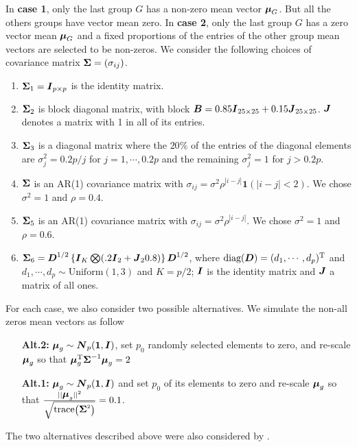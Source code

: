 \documentclass[12pt]{article}
\theoremstyle{plain}%
\theoremstyle{definition}
\def\diag{\hbox{diag}}
\def\diag{\hbox{diag}}
\def\trace{\hbox{trace}}
\def\diag{\hbox{diag}}
\def\diag{\hbox{diag}}
\def\trace{\hbox{trace}}
\def\trans{^{\rm T}}
\def\bone{{\mathbf 1}}
\newcommand{\uB}       {\mbox{\boldmath$B$}}
\newcommand{\uD}       {\mbox{\boldmath$D$}}
\newcommand{\uI}       {\mbox{\boldmath$I$}}
\newcommand{\uJ}       {\mbox{\boldmath$J$}}
\newcommand{\uN}       {\mbox{\boldmath$N$}}
\newcommand{\umu}               {\mbox{\boldmath$\mu$}}
\newcommand{\uSigma}            {\mbox{\boldmath$\Sigma$}}
\begin{document}
In \textbf{case 1}, only the last group $G$ has a non-zero mean vector $\umu_G$. But all the others groups have vector mean zero. In \textbf{case 2}, only the last group $G$ has a zero vector mean $\umu_{G}$ and a fixed proportions of the entries of the other group mean vectors are selected to be non-zeros.  
We consider the following choices of covariance matrix $\uSigma=(\sigma_{ij})$.
\begin{enumerate}
  \item $\uSigma_{1} = \uI_{p \times p} $ is the identity matrix.
  \item $\uSigma_{2} $ is block diagonal matrix, with block $\uB = 0.85\uI_{25 \times 25} + 0.15\uJ_{25 \times 25}$. $\uJ$ denotes a matrix with 1 in all of its entries.
  \item $\uSigma_{3}$ is a diagonal matrix where the $20\%$ of the entries of the diagonal elements are $\sigma^2_j = 0.2p/j$ for $j = 1, \cdots, 0.2p$ and the remaining $\sigma^2_j = 1$ for $j > 0.2p$.
  \item $\uSigma$ is an AR(1) covariance matrix with $\sigma_{ij}=\sigma^2\rho^{|i - j|}\bone(|i-j| < 2)$. We chose $\sigma^2 = 1$ and $\rho = 0.4$.
  \item $\uSigma_{5}$ is an AR(1) covariance matrix with $\sigma_{ij}=\sigma^2\rho^{|i - j|}$. We chose $\sigma^2 = 1$ and $\rho = 0.6$.
  \item $\uSigma_6 = \uD^{1/2}\left\{ \uI_K \bigotimes (.2\uI_2 + \uJ_{2}0.8) \right\}\uD^{1/2}$, where $\diag(\uD)=(d_{1}, \cdots, d_{p})\trans$ and $d_{1}, \cdots, d_{p} \sim \text{Uniform}(1, 3)$ and $K = p/2$; $\uI$ is the identity matrix and $\uJ$ a matrix of all ones.
\end{enumerate}
For each case, we also consider two possible alternatives. We simulate the non-all zeros mean vectors as follow
\begin{enumerate}[label=(\alph*)]
 \item[{\bf Alt.2:}]  $\umu_g \sim \uN_{p}(\bf{1}, \uI)$, set $p_0$ randomly selected elements to zero, and re-scale $\umu_g$ so that $\umu_g \trans\uSigma ^{-1}  \umu_g = 2$ 
 \item[{\bf Alt.1:}] $\umu_g \sim \uN_{p}(\bf{1}, \uI)$ and set $p_0$ of its elements to zero and re-scale $\umu_g$ so that $\frac{||\umu_{g}||^{2}}{\sqrt{\trace\left( \uSigma ^{2}\right)}} = 0.1$.
\end{enumerate}
The two alternatives described above were also considered by \citet{srivastava2014raptt,zoh2018powerful}.
\end{document}
